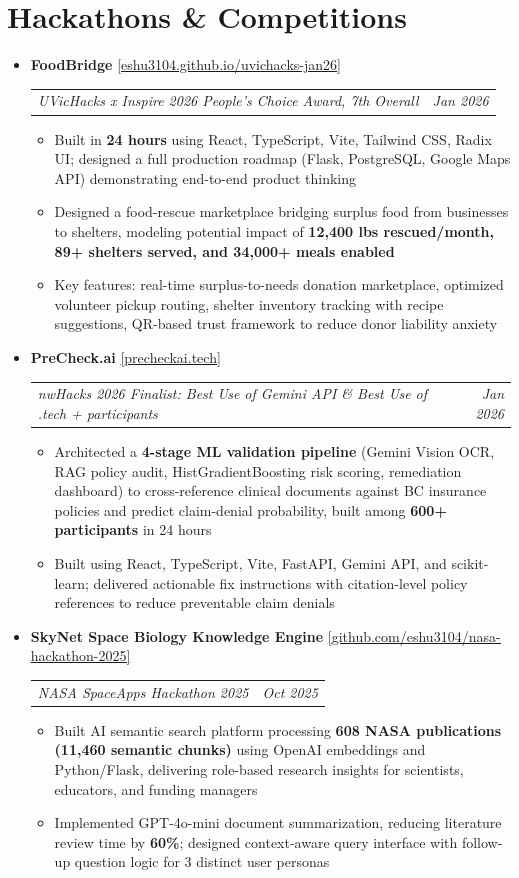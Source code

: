 \documentclass[10pt,letterpaper]{article}
\makeatletter
\newcommand{\resumeProjectHeading}[5]{%
  \vspace{5pt}%
  \item[]%
    {\small \textbf{#1} \enspace \href{#5}{\textcolor{accentblue}{[\underline{#2}]}}}\\[2pt]%
    {\small \begin{tabular*}{0.99\textwidth}{l@{\extracolsep{\fill}}r}%
      \textcolor{midgray}{\textit{\hspace{2pt}#3}} & \textcolor{midgray}{\textit{#4}}%
    \end{tabular*}}%
  \vspace{3pt}%
}
\newcommand{\resumeItem}[1]{
  \item {\small #1}
}
\makeatother
\begin{document}
\section{Hackathons \& Competitions}
\begin{itemize}[leftmargin=0in, label={}]

  \resumeProjectHeading
    {FoodBridge}{eshu3104.github.io/uvichacks-jan26}
    {UVicHacks x Inspire 2026 \enspace People's Choice Award, 7th Overall}
    {Jan 2026}
    {https://eshu3104.github.io/uvichacks-jan26/}
  \begin{itemize}
    \resumeItem{Built in \textbf{24 hours} using React, TypeScript, Vite, Tailwind CSS, Radix UI; designed a full production roadmap (Flask, PostgreSQL, Google Maps API) demonstrating end-to-end product thinking}
    \resumeItem{Designed a food-rescue marketplace bridging surplus food from businesses to shelters, modeling potential impact of \textbf{12,400 lbs rescued/month, 89+ shelters served, and 34,000+ meals enabled}}
    \resumeItem{Key features: real-time surplus-to-needs donation marketplace, optimized volunteer pickup routing, shelter inventory tracking with recipe suggestions, QR-based trust framework to reduce donor liability anxiety}
  \end{itemize}

  \resumeProjectHeading
    {PreCheck.ai}{precheckai.tech}
    {nwHacks 2026 \enspace Finalist: Best Use of Gemini API \& Best Use of .tech \enspace 600+ participants}
    {Jan 2026}
    {https://www.precheckai.tech}
  \begin{itemize}
    \resumeItem{Architected a \textbf{4-stage ML validation pipeline} (Gemini Vision OCR, RAG policy audit, HistGradientBoosting risk scoring, remediation dashboard) to cross-reference clinical documents against BC insurance policies and predict claim-denial probability, built among \textbf{600+ participants} in 24 hours}
    \resumeItem{Built using React, TypeScript, Vite, FastAPI, Gemini API, and scikit-learn; delivered actionable fix instructions with citation-level policy references to reduce preventable claim denials}
  \end{itemize}

  \resumeProjectHeading
    {SkyNet Space Biology Knowledge Engine}{github.com/eshu3104/nasa-hackathon-2025}
    {NASA SpaceApps Hackathon 2025}
    {Oct 2025}
    {https://github.com/eshu3104/nasa-hackathon-2025}
  \begin{itemize}
    \resumeItem{Built AI semantic search platform processing \textbf{608 NASA publications (11,460 semantic chunks)} using OpenAI embeddings and Python/Flask, delivering role-based research insights for scientists, educators, and funding managers}
    \resumeItem{Implemented GPT-4o-mini document summarization, reducing literature review time by \textbf{60\%}; designed context-aware query interface with follow-up question logic for 3 distinct user personas}
  \end{itemize}


\end{itemize}
\end{document}

